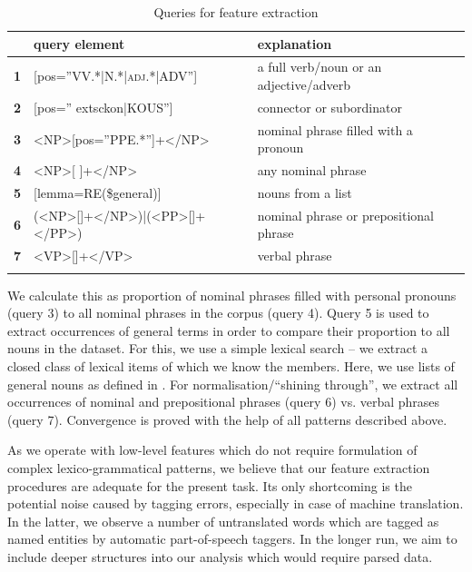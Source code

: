 \documentclass[output=paper]{LSP/langsci}
\begin{document}
\begin{table}
     \centering
     \begin{tabular}{lll}
\lsptoprule
              & \textbf{query element}         & \textbf{explanation} \\ \midrule
\textbf{1}    & [pos=”VV.*|N.*|\textsc{adj}.*|ADV”]     & a full verb/noun or an adjective/adverb \\
\textbf{2}    & [pos=”	extsc{kon}|KOUS”]               & connector or subordinator \\
\textbf{3}    & <NP>[pos=”PPE.*”]+</NP>		   & nominal phrase filled with a pronoun \\
\textbf{4}    & <NP>[ ]+</NP>             & any nominal phrase \\ 
\textbf{5}    & [lemma=RE(\$general)]     & nouns from a list   \\ 
\textbf{6}    & (<NP>[]+</NP>)|(<PP>[]+</PP>) & nominal phrase or prepositional phrase \\
\textbf{7}    & <VP>[]+</VP> & verbal phrase\\
\lspbottomrule
     \end{tabular}

 \caption{Queries for feature extraction}
     \label{tab:4.1}
\end{table}

We calculate this as proportion of nominal phrases filled with personal pronouns (query 3) to all nominal phrases in the corpus (query 4). Query 5 is used to extract occurrences of general terms in order to compare their proportion to all nouns in the dataset. For this, we use a simple lexical search – we extract a closed class of lexical items of which we know the members. Here, we use lists of general nouns as defined in \citep{Dipper2012}. For normalisation/“shining through”, we extract all occurrences of nominal and prepositional phrases (query 6) vs. verbal phrases (query 7). Convergence is proved with the help of all patterns described above.

As we operate with low-level features which do not require formulation of complex lexico-grammatical patterns, we believe that our feature extraction procedures are adequate for the present task.  Its only shortcoming is the potential noise caused by tagging errors, especially in case of machine translation. In the latter, we observe a number of untranslated words which are tagged as named entities by automatic part-of-speech taggers.  In the longer run, we aim to include deeper structures into our analysis which would require parsed data.
\end{document}

